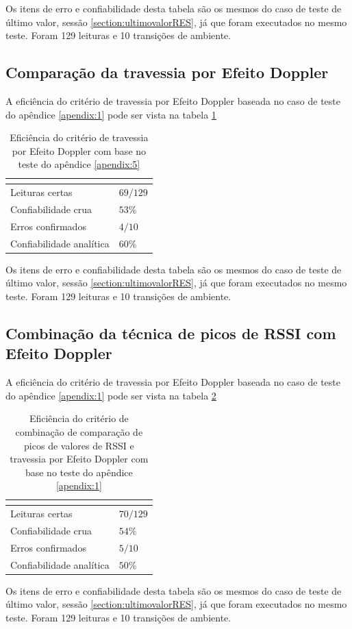 Os itens de erro e confiabilidade desta tabela são os mesmos do caso de teste de último valor, sessão \ref{section:ultimovalorRES}, já que foram executados no mesmo teste. Foram 129 leituras e 10 transições de ambiente.

\subsection{Comparação da travessia por Efeito Doppler}


A eficiência do critério de travessia por Efeito Doppler baseada no caso de teste do apêndice \ref{apendix:1} pode ser vista na tabela \ref{tab:resultados5}

\begin{table}[H]
\centering
\caption{Eficiência do critério de travessia por Efeito Doppler com base no teste do apêndice \ref{apendix:5} }
\label{tab:resultados5}
\begin{tabular}{p{5cm} p{5cm}}
\hline
\multicolumn{2}{c}{\cellcolor{lightgray}{Eficiência do critério: Travessia por efeito Doppler}} \\ \hline
Leituras certas         &   $69 / 129$        \\
Confiabilidade crua    &   $53\%$     \\
Erros confirmados          &  $4 / 10$        \\
Confiabilidade analítica & $60\%$ \\ \hline
\end{tabular}
\end{table}

Os itens de erro e confiabilidade desta tabela são os mesmos do caso de teste de último valor, sessão \ref{section:ultimovalorRES}, já que foram executados no mesmo teste. Foram 129 leituras e 10 transições de ambiente.

\subsection{Combinação da técnica de picos de RSSI com Efeito Doppler}

A eficiência do critério de travessia por Efeito Doppler baseada no caso de teste do apêndice \ref{apendix:1} pode ser vista na tabela \ref{tab:resultados6}

\begin{table}[H]
\centering
\caption{Eficiência do critério de combinação de comparação de picos de valores de RSSI e travessia por Efeito Doppler com base no teste do apêndice \ref{apendix:1} }
\label{tab:resultados6}
\begin{tabular}{p{5cm} p{5cm}}
\hline
\multicolumn{2}{c}{\cellcolor{lightgray}{Eficiência do critério: Travessia por efeito Doppler}} \\ \hline
Leituras certas         &   $70 / 129$        \\
Confiabilidade crua    &   $54\%$     \\
Erros confirmados          &  $5 / 10$        \\
Confiabilidade analítica & $50\%$ \\ \hline
\end{tabular}
\end{table}

Os itens de erro e confiabilidade desta tabela são os mesmos do caso de teste de último valor, sessão \ref{section:ultimovalorRES}, já que foram executados no mesmo teste. Foram 129 leituras e 10 transições de ambiente.